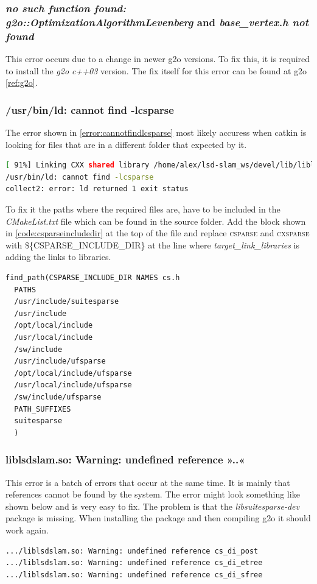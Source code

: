 \subsubsection{\textit{no such function found: g2o::OptimizationAlgorithmLevenberg} and \textit{base\_vertex.h not found}}
This error occurs due to a change in newer \gls{g2o} versions. To fix this, it is required to install the \textit{g2o c++03} version. The fix  itself for this error can be found at \gls{g2o} \ref{ref:g2o}.

\subsubsection{/usr/bin/ld: cannot find -lcsparse}
The error shown in \ref{error:cannotfindlcsparse} most likely accuress when catkin is looking for files that are in a different folder that expected by it.
\begin{lstlisting}[language=bash,label={error:cannotfindlcsparse}]
[ 91%] Linking CXX shared library /home/alex/lsd-slam_ws/devel/lib/liblsdslam.so
/usr/bin/ld: cannot find -lcsparse
collect2: error: ld returned 1 exit status
\end{lstlisting}
To fix it the paths where the required files are, have to be included in the \textit{CMakeList.txt} file which can be found in the source folder. Add the block shown in \ref{code:csparseincludedir} at the top of the file and replace \textsc{csparse} and \textsc{cxsparse} with \textsc{\$\{CSPARSE\_INCLUDE\_DIR\}} at the line where \textit{target\_link\_libraries} is adding the links to libraries.

\begin{lstlisting}[label={error:csparseincludedir}]
find_path(CSPARSE_INCLUDE_DIR NAMES cs.h
  PATHS
  /usr/include/suitesparse
  /usr/include
  /opt/local/include
  /usr/local/include
  /sw/include
  /usr/include/ufsparse
  /opt/local/include/ufsparse
  /usr/local/include/ufsparse
  /sw/include/ufsparse
  PATH_SUFFIXES
  suitesparse
  )
\end{lstlisting}

\subsubsection{liblsdslam.so: Warning: undefined reference »..«}
This error is a batch of errors that occur at the same time.
It is mainly that references cannot be found by the system. The error might look something like shown below and is very easy to fix. The problem is that the \textit{libsuitesparse-dev} package is missing. When installing the package and then compiling \gls{g2o} it should work again.
\begin{lstlisting}[language=bash]
.../liblsdslam.so: Warning: undefined reference cs_di_post
.../liblsdslam.so: Warning: undefined reference cs_di_etree
.../liblsdslam.so: Warning: undefined reference cs_di_sfree
\end{lstlisting}

